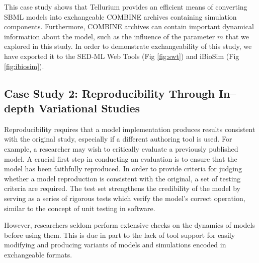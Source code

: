\documentclass[10pt,letterpaper]{article}
\begin{document}
This case study shows that Tellurium provides an efficient means of converting SBML models into exchangeable COMBINE archives containing simulation components. Furthermore, COMBINE archives can contain important dynamical information about the model, such as the influence of the parameter $m$ that we explored in this study. In order to demonstrate exchangeability of this study, we have exported it to the SED-ML Web Tools \cite{bergmann2017sed} (Fig \ref{fig:swt}) and iBioSim \cite{myers2009ibiosim} (Fig \ref{fig:ibiosim}).

\subsection*{Case Study 2: Reproducibility Through In--depth Variational Studies}


Reproducibility requires that a model implementation produces results consistent with the original study, especially if a different authoring tool is used. For example, a researcher may wish to critically evaluate a previously published model. A crucial first step in conducting an evaluation is to ensure that the model has been faithfully reproduced. In order to provide criteria for judging whether a model reproduction is consistent with the original, a set of testing criteria are required. The test set strengthens the credibility of the model by serving as a series of rigorous tests which verify the model's correct operation, similar to the concept of unit testing in software.

However, researchers seldom perform extensive checks on the dynamics of models before using them. This is due in part to the lack of tool support for easily modifying and producing variants of models and simulations encoded in exchangeable formats.
\end{document}
